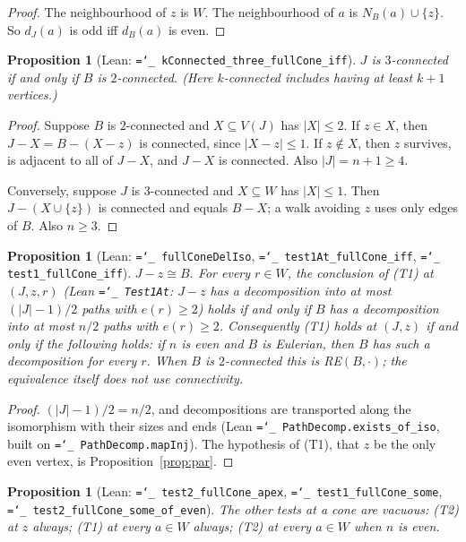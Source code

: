 \documentclass[11pt]{amsart}
\newtheorem{proposition}[theorem]{Proposition}
\theoremstyle{definition}
\newcommand{\lean}[1]{\texttt{\hyphenchar\font=`\_ #1}}
\begin{document}
\begin{proof}
The neighbourhood of $z$ is $W$. The neighbourhood of $a$ is $N_B(a)\cup\{z\}$. So $d_J(a)$ is odd iff
$d_B(a)$ is even.
\end{proof}

\begin{proposition}[Lean: \lean{kConnected\_three\_fullCone\_iff}]\label{prop:conn}
$J$ is $3$-connected if and only if $B$ is $2$-connected. (Here $k$-connected includes having at least
$k+1$ vertices.)
\end{proposition}

\begin{proof}
Suppose $B$ is $2$-connected and $X\subseteq V(J)$ has $|X|\le 2$. If $z\in X$, then $J-X=B-(X-z)$ is
connected, since $|X-z|\le1$. If $z\notin X$, then $z$ survives, is adjacent to all of $J-X$, and $J-X$
is connected. Also $|J|=n+1\ge 4$.

Conversely, suppose $J$ is $3$-connected and $X\subseteq W$ has $|X|\le1$. Then $J-(X\cup\{z\})$ is
connected and equals $B-X$; a walk avoiding $z$ uses only edges of $B$. Also $n\ge 3$.
\end{proof}

\begin{proposition}[Lean: \lean{fullConeDelIso}, \lean{test1At\_fullCone\_iff},
\lean{test1\_fullCone\_iff}]\label{prop:t1}
$J-z\cong B$. For every $r\in W$, the \emph{conclusion} of (T1) at $(J,z,r)$ (Lean \lean{Test1At}:
$J-z$ has a decomposition into at most $(|J|-1)/2$ paths with $e(r)\ge2$) holds if and only if $B$
has a decomposition into at most $n/2$ paths with $e(r)\ge2$. Consequently (T1) holds at $(J,z)$ if and only if the following
holds: if $n$ is even and $B$ is Eulerian, then $B$ has such a decomposition for every $r$. When $B$
is $2$-connected this is RE$(B,\cdot)$; the equivalence itself does not use connectivity.
\end{proposition}

\begin{proof}
$(|J|-1)/2=n/2$, and decompositions are transported along the isomorphism with their sizes and
ends (Lean \lean{PathDecomp.exists\_of\_iso}, built on \lean{PathDecomp.mapInj}). The hypothesis
of (T1), that $z$ be the only even vertex, is Proposition~\ref{prop:par}.
\end{proof}

\begin{proposition}[Lean: \lean{test2\_fullCone\_apex}, \lean{test1\_fullCone\_some},
\lean{test2\_fullCone\_some\_of\_even}]\label{prop:vac}
The other tests at a cone are vacuous: (T2) at $z$ always; (T1) at every $a\in W$ always; (T2) at every
$a\in W$ when $n$ is even.
\end{proposition}
\end{document}
